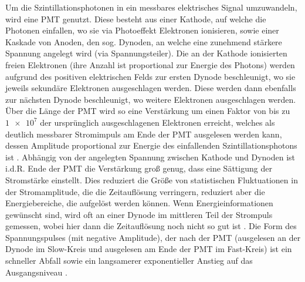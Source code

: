 Um die Szintillationsphotonen in ein messbares elektrisches Signal umzuwandeln, wird eine PMT genutzt. Diese besteht aus einer Kathode, auf welche die Photonen einfallen, wo sie via Photoeffekt Elektronen ionisieren, sowie einer Kaskade von Anoden, den sog. Dynoden, an welche eine zunehmend stärkere Spannung angelegt wird (via Spannungsteiler). Die an der Kathode ionisierten freien Elektronen (ihre Anzahl ist proportional zur Energie des Photons) werden aufgrund des positiven elektrischen Felds zur ersten Dynode beschleunigt, wo sie jeweils sekundäre Elektronen ausgeschlagen werden. Diese werden dann ebenfalls zur nächsten Dynode beschleunigt, wo weitere Elektronen ausgeschlagen werden. Über die Länge der PMT wird so eine Verstärkung um einen Faktor von bis zu $\num{1e7}$ \cite[181]{leotechniques} der ursprünglich ausgeschlagenen Elektronen erreicht, welches als deutlich messbarer Stromimpuls am Ende der PMT ausgelesen werden kann, dessen Amplitude proportional zur Energie des einfallenden Szintillationsphotons ist \cite[177-189]{leotechniques}. Abhängig von der angelegten Spannung zwischen Kathode und Dynoden ist i.d.R. Ende der PMT die Verstärkung groß genug, dass eine Sättigung der Stromstärke einstellt. Dies reduziert die Größe von statistischen Fluktuationen in der Stromamplitude, die die Zeitauflösung verringern, reduziert aber die Energiebereiche, die aufgelöst werden können. Wenn Energieinformationen gewünscht sind, wird oft an einer Dynode im mittleren Teil der Strompuls gemessen, wobei hier dann die Zeitauflösung noch nicht so gut ist \cite[314]{leotechniques}.
Die Form des Spannungspulses (mit negative Amplitude), der nach der PMT (ausgelesen an der Dynode im Slow-Kreis und ausgelesen am Ende der PMT im Fast-Kreis) ist ein schneller Abfall sowie ein langsamerer exponentieller Anstieg auf das Ausgangsniveau \cite[189-190]{leotechniques}.
